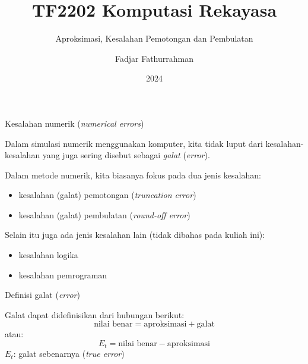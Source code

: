 

\title{TF2202 Komputasi Rekayasa}
\subtitle{Aproksimasi, Kesalahan Pemotongan dan Pembulatan}
\author{Fadjar Fathurrahman}
\date{2024}



\frame{\titlepage}

\begin{frame}{Kesalahan numerik (\textit{numerical errors})}

Dalam simulasi numerik menggunakan komputer, kita tidak luput dari
kesalahan-kesalahan yang juga sering disebut sebagai
\emph{galat} (\emph{error}).

Dalam metode numerik, kita biasanya fokus pada dua jenis kesalahan:
\begin{itemize}\tightlist
\item kesalahan (galat) pemotongan (\textit{truncation error})
\item kesalahan (galat) pembulatan (\textit{round-off error})
\end{itemize}

Selain itu juga ada jenis kesalahan lain (tidak dibahas
pada kuliah ini):
\begin{itemize}
\item kesalahan logika
\item kesalahan pemrograman
\end{itemize}

\end{frame}



\begin{frame}{Definisi galat (\textit{error})}

Galat dapat didefinisikan dari hubungan berikut:
\begin{equation*}
\text{nilai benar} = \text{aproksimasi} + \text{galat}
\end{equation*}
atau:
\begin{equation*}
E_{t} = \text{nilai benar} - \text{aproksimasi}
\end{equation*}
$E_t$: galat sebenarnya (\textit{true error})

\end{frame}


